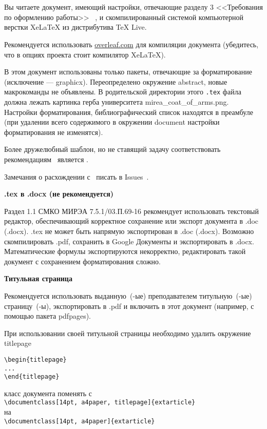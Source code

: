 \documentclass[14pt, a4paper, titlepage]{extarticle}
\renewenvironment{abstract}{\clearpage\section*{\MakeUppercase{\abstractname}}}{}
\begin{document}
\begin{abstract}
    Вы читаете документ, имеющий настройки, отвечающие разделу 3 <<Требования по оформлению работы>> ~\cite{bib:recomendations}, и скомпилированный системой компьютерной верстки Xe\LaTeX{} из дистрибутива TeX Live.
    
    Рекомендуется использовать \url{overleaf.com} для компиляции документа (убедитесь, что в опциях проекта стоит компилятор XeLaTeX).
    
    В этом документ использованы только пакеты, отвечающие за форматирование (исключение --- graphicx). Переопределено окружение abstract, новые макрокоманды не объявлены. В родительской директории этого \verb".tex" файла должна лежать картинка герба университета mirea\_coat\_of\_arms.png. Настройки форматирования, библиографический список находятся в преамбуле (при удалении всего содержимого в окружении document настройки форматирования не изменятся).
    
    Более дружелюбный шаблон, но не ставящий задачу соответствовать рекомендациям~\cite{bib:recomendations} является \cite{bib:mntemplate}.
    
    Замечания о расхождении с~\cite{bib:recomendations} писать в Issues~\cite{bib:githubrepo}.
    
    \textbf{.tex в .docx (не рекомендуется)}
    
    Раздел 1.1 СМКО МИРЭА 7.5.1/03.П.69-16 рекомендует использовать текстовый редактор, обеспечивающий корректное сохранение или экспорт документа в .doc (.docx). .tex не может быть напрямую экспортирован в .doc (.docx). Возможно скомпилировать .pdf, сохранить в Google Документы и экспортировать в .docx. Математические формулы экспортируются некорректно, редактировать такой документ с сохранением форматирования сложно.
    
    \textbf{Титульная страница}
    
    Рекомендуется использовать выданную~(-ые) преподавателем ти\-туль\-ну\-ю~\mbox{(-ые)} страницу~(-ы), экспортировать в .pdf и включить в этот документ (например, с помощью пакета pdfpages).
    
    При использовании своей титульной страницы необходимо удалить окружение titlepage
    \begin{verbatim}
\begin{titlepage}
...
\end{titlepage}
    \end{verbatim}
    класс документа поменять с \\ \verb"\documentclass[14pt, a4paper, titlepage]{extarticle}" \\ на \\ \verb"\documentclass[14pt, a4paper]{extarticle}"
    

\end{abstract}
\end{document}
